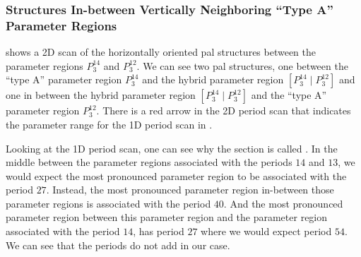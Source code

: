 \subsubsection{ Structures In-between Vertically Neighboring ``Type A'' Parameter Regions}

 shows a 2D scan of the horizontally oriented \gls{pal} structures between the parameter regions $P^{14}_3$ and $P^{12}_3$.
We can see two \gls{pal} structures, one between the ``type A'' parameter region $P^{14}_3$ and the hybrid parameter region $\left[P^{14}_3 \mid P^{12}_3\right]$ and one in between the hybrid parameter region $\left[P^{14}_3 \mid P^{12}_3\right]$ and the ``type A'' parameter region $P^{12}_3$.
There is a red arrow in the 2D period scan that indicates the parameter range for the 1D period scan in .

Looking at the 1D period scan, one can see why the section is called .
In the middle between the parameter regions associated with the periods $14$ and $13$, we would expect the most pronounced parameter region to be associated with the period $27$.
Instead, the most pronounced parameter region in-between those parameter regions is associated with the period $40$.
And the most pronounced parameter region between this parameter region and the parameter region associated with the period $14$, has period $27$ where we would expect period $54$.
We can see that the periods do not add in our case.

